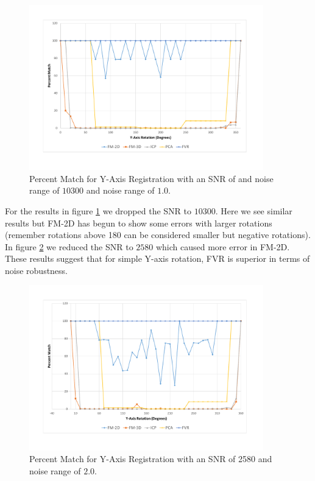 \begin{figure}[!htb]
\centering
\includegraphics[width=4.0in]{images/results/noise/YRNoise1}
\caption{Percent Match for Y-Axis Registration with an SNR of and noise range of $10300$ and noise range of $1.0$.}
\label{fig:YRNoise1}
\end{figure}

For the results in figure \ref{fig:YRNoise1} we dropped the SNR to $10300$. Here we see similar results but FM-2D has begun to show some errors with larger rotations (remember rotations above 180 can be considered smaller but negative rotations). In figure \ref{fig:YRNoise2} we reduced the SNR to $2580$ which caused more error in FM-2D. These results suggest that for simple Y-axis rotation, FVR is superior in terms of noise robustness. 

\begin{figure}[!htb]
\centering
\includegraphics[width=4.0in]{images/results/noise/YRNoise2}
\caption{Percent Match for Y-Axis Registration with an SNR of 2580 and noise range of $2.0$.}
\label{fig:YRNoise2}
\end{figure}


